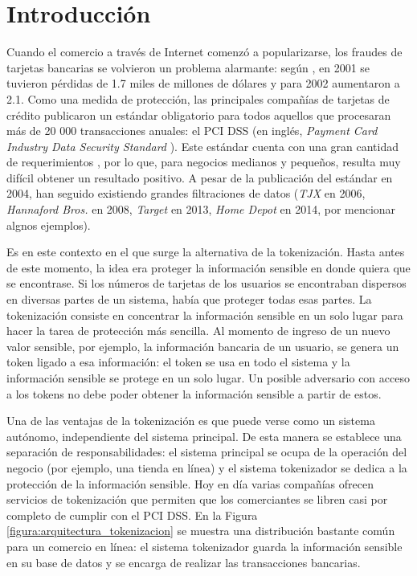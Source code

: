 %
%

\section{Introducción}


Cuando el comercio a través de Internet comenzó a popularizarse, los fraudes de
tarjetas bancarias se volvieron un problema alarmante: según \cite{wallethub},
en 2001 se tuvieron pérdidas de 1.7 miles de millones de dólares y para 2002
aumentaron a 2.1. Como una medida de protección, las principales compañías de
tarjetas de crédito publicaron un estándar obligatorio para todos aquellos que
procesaran más de 20 000 transacciones anuales: el PCI DSS (en inglés,
\textit{Payment Card Industry Data Security Standard} \cite{pci_dss}). Este
estándar cuenta con una gran cantidad de requerimientos \cite{uk_association}
\cite{search_security}, por lo que, para negocios medianos y pequeños, resulta
muy difícil obtener un resultado positivo. A pesar de la publicación del
estándar en 2004, han seguido existiendo grandes filtraciones de datos
(\textit{TJX} en 2006, \textit{Hannaford Bros.} en 2008, \textit{Target} en
2013, \textit{Home Depot} en 2014, por mencionar algnos ejemplos).


Es en este contexto en el que surge la alternativa de la tokenización. Hasta
antes de este momento, la idea era proteger la información sensible en donde
quiera que se encontrase. Si los números de tarjetas de los usuarios se
encontraban dispersos en diversas partes de un sistema, había que proteger todas
esas partes. La tokenización consiste en concentrar la información sensible en
un solo lugar para hacer la tarea de protección más sencilla. Al momento de
ingreso de un nuevo valor sensible, por ejemplo, la información bancaria de un
usuario, se genera un token ligado a esa información: el token se usa en todo el
sistema y la información sensible se protege en un solo lugar. Un posible
adversario con acceso a los tokens no debe poder obtener la información sensible
a partir de estos.

Una de las ventajas de la tokenización es que puede verse como un sistema
autónomo, independiente del sistema principal. De esta manera se establece una
separación de responsabilidades: el sistema principal se ocupa de la operación
del negocio (por ejemplo, una tienda en línea) y el sistema tokenizador se
dedica a la protección de la información sensible. Hoy en día varias compañías
ofrecen servicios de tokenización que permiten que los comerciantes se libren
casi por completo de cumplir con el PCI DSS. En la Figura
\ref{figura:arquitectura_tokenizacion} se muestra una distribución bastante
común para un comercio en línea: el sistema tokenizador guarda la información
sensible en su base de datos y se encarga de realizar las transacciones
bancarias.

